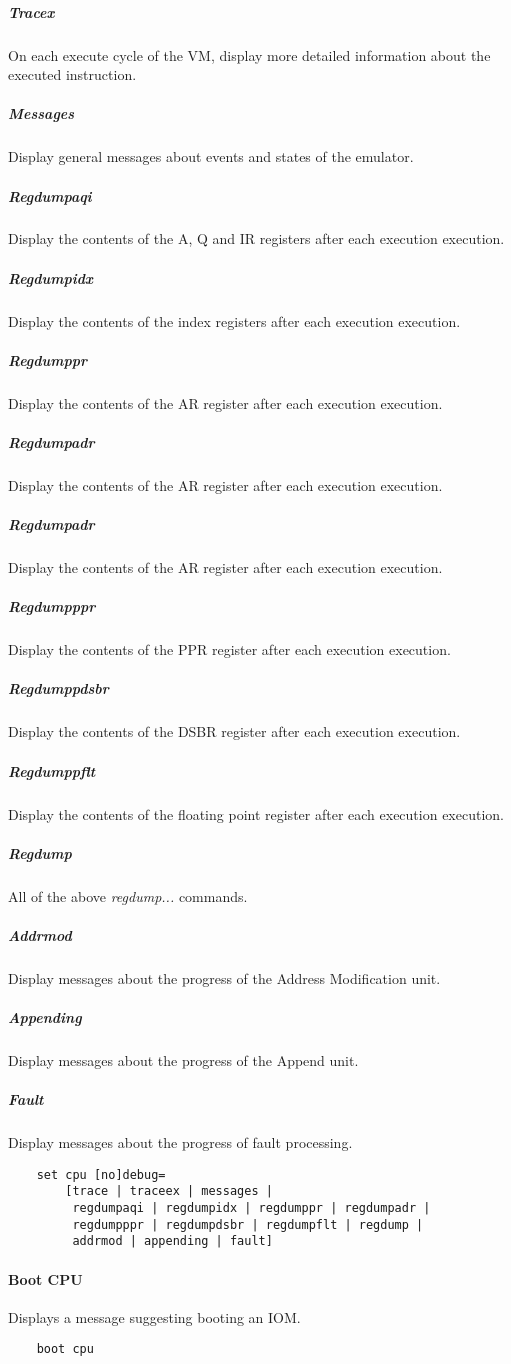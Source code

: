 \documentclass[notitlepage]{report}
\begin{document}
\subparagraph{Tracex}
On each execute cycle of the VM, display more detailed information about the executed instruction.

\subparagraph{Messages}
Display general messages about events and states of the emulator.

\subparagraph{Regdumpaqi}
Display the contents of the A, Q and IR registers after each execution execution.

\subparagraph{Regdumpidx}
Display the contents of the index registers after each execution execution.

\subparagraph{Regdumppr}
Display the contents of the AR register after each execution execution.

\subparagraph{Regdumpadr}
Display the contents of the AR register after each execution execution.

\subparagraph{Regdumpadr}
Display the contents of the AR register after each execution execution.

\subparagraph{Regdumpppr}
Display the contents of the PPR register after each execution execution.

\subparagraph{Regdumppdsbr}
Display the contents of the DSBR register after each execution execution.

\subparagraph{Regdumppflt}
Display the contents of the floating point register after each execution execution.

\subparagraph{Regdump}
All of the above \textit{regdump...} commands.

\subparagraph{Addrmod}
Display messages about the progress of the Address Modification unit.

\subparagraph{Appending}
Display messages about the progress of the Append unit.

\subparagraph{Fault}
Display messages about the progress of fault processing.

\begin{lstlisting}
	set cpu [no]debug=
		[trace | traceex | messages |
		 regdumpaqi | regdumpidx | regdumppr | regdumpadr |
		 regdumpppr | regdumpdsbr | regdumpflt | regdump |
		 addrmod | appending | fault]
\end{lstlisting}

\paragraph{Boot CPU}
Displays a message suggesting booting an IOM.

\begin{lstlisting}
	boot cpu
\end{lstlisting}
\end{document}
